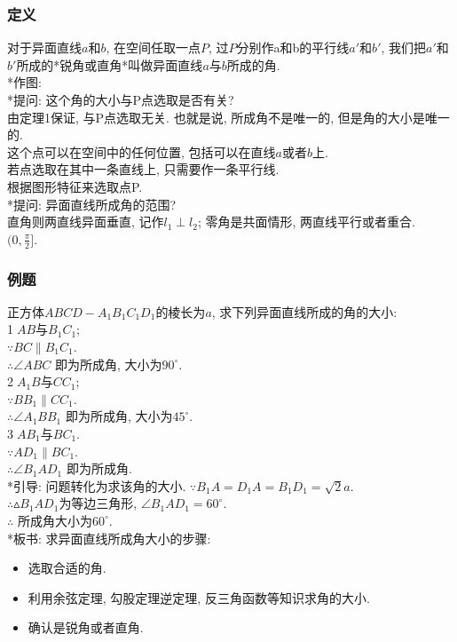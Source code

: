 \documentclass{article}
\begin{document}
\begin{CJK}{UTF8}{gkai}
\subsubsection{定义}
对于异面直线$a$和$b$, 在空间任取一点$P$, 过$P$分别作a和b的平行线$a'$和$b'$, 我们把$a'$和$b'$所成的*锐角或直角*叫做异面直线$a$与$b$所成的角.\\
*作图:\\
*提问: 这个角的大小与P点选取是否有关?\\
由定理1保证, 与P点选取无关. 也就是说, 所成角不是唯一的, 但是角的大小是唯一的.\\
这个点可以在空间中的任何位置, 包括可以在直线$a$或者$b$上.\\
若点选取在其中一条直线上, 只需要作一条平行线.\\
根据图形特征来选取点P.\\
\newline
*提问: 异面直线所成角的范围?\\
直角则两直线异面垂直, 记作$l_1\perp l_2$; 零角是共面情形, 两直线平行或者重合. \\
$(0, \frac{\pi}{2}]$.

\subsubsection{例题}
正方体$ABCD-A_1B_1C_1D_1$的棱长为$a$, 求下列异面直线所成的角的大小:\\
\textcircled{1}$AB$与$B_1C_1$;\\
$\because BC \parallel B_1C_1$.\\
$\therefore \angle ABC$ 即为所成角, 大小为$90^ \circ$.\\
\textcircled{2}$A_1B$与$CC_1$;\\
$\because BB_1 \parallel CC_1$.\\
$\therefore \angle A_1BB_1$ 即为所成角, 大小为$45^ \circ$.\\
\textcircled{3}$AB_1$与$BC_1$.\\
$\because AD_1 \parallel BC_1$.\\
$\therefore \angle B_1AD_1$ 即为所成角.\\
*引导: 问题转化为求该角的大小.
$\because B_1A = D_1A = B_1D_1 = \sqrt{2}a$.\\
$\therefore \vartriangle B_1AD_1$为等边三角形, $\angle B_1AD_1 = 60^ \circ$.\\
$\therefore$ 所成角大小为$60^ \circ$.\\
\newline
*板书: 求异面直线所成角大小的步骤:\\
\begin{itemize}
\item 选取合适的角.
\item 利用余弦定理, 勾股定理逆定理, 反三角函数等知识求角的大小.
\item 确认是锐角或者直角.
\end{itemize}


\end{CJK}
\end{document}
